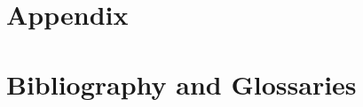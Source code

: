 \documentclass[ twoside,openright,titlepage,numbers=noenddot,headinclude,%
                footinclude=true,cleardoublepage=empty,abstractoff, %
                BCOR=5mm,paper=a4,fontsize=11pt,%
                ngerman,american,%
                ]{scrreprt}
\begin{document}
\appendix
\cleardoublepage
\part{Appendix}






\part{Bibliography and Glossaries}
\cleardoublepage
%
\cleardoublepage
\cleardoublepage
\end{document}
